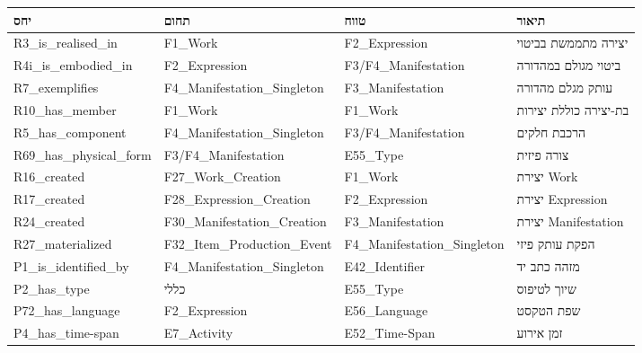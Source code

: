 \documentclass[12pt,a4paper]{article}
\newcommand{\en}[1]{\textenglish{\LR{#1}}}
\begin{document}
{\small
\begin{longtable}{|p{4cm}|p{3.5cm}|p{3.5cm}|p{4.5cm}|}
\hline
\textbf{יחס} & \textbf{תחום} & \textbf{טווח} & \textbf{תיאור} \\
\hline
\endhead

\textenglish{R3\_is\_realised\_in} & \textenglish{F1\_Work} & \textenglish{F2\_Expression} & יצירה מתממשת בביטוי \\
\hline
\textenglish{R4i\_is\_embodied\_in} & \textenglish{F2\_Expression} & \textenglish{F3/F4\_Manifestation} & ביטוי מגולם במהדורה \\
\hline
\textenglish{R7\_exemplifies} & \textenglish{F4\_Manifestation\_Singleton} & \textenglish{F3\_Manifestation} & עותק מגלם מהדורה \\
\hline
\textenglish{R10\_has\_member} & \textenglish{F1\_Work} & \textenglish{F1\_Work} & בת-יצירה כוללת יצירות \\
\hline
\textenglish{R5\_has\_component} & \textenglish{F4\_Manifestation\_Singleton} & \textenglish{F3/F4\_Manifestation} & הרכבת חלקים \en{(BU→CU→PU)} \\
\hline
\textenglish{R69\_has\_physical\_form} & \textenglish{F3/F4\_Manifestation} & \textenglish{E55\_Type} & צורה פיזית \\
\hline
\textenglish{R16\_created} & \textenglish{F27\_Work\_Creation} & \textenglish{F1\_Work} & יצירת \textenglish{Work} \\
\hline
\textenglish{R17\_created} & \textenglish{F28\_Expression\_Creation} & \textenglish{F2\_Expression} & יצירת \textenglish{Expression} \\
\hline
\textenglish{R24\_created} & \textenglish{F30\_Manifestation\_Creation} & \textenglish{F3\_Manifestation} & יצירת \textenglish{Manifestation} \\
\hline
\textenglish{R27\_materialized} & \textenglish{F32\_Item\_Production\_Event} & \textenglish{F4\_Manifestation\_Singleton} & הפקת עותק פיזי \\
\hline
\textenglish{P1\_is\_identified\_by} & \textenglish{F4\_Manifestation\_Singleton} & \textenglish{E42\_Identifier} & מזהה כתב יד \\
\hline
\textenglish{P2\_has\_type} & כללי & \textenglish{E55\_Type} & שיוך לטיפוס \\
\hline
\textenglish{P72\_has\_language} & \textenglish{F2\_Expression} & \textenglish{E56\_Language} & שפת הטקסט \\
\hline
\textenglish{P4\_has\_time-span} & \textenglish{E7\_Activity} & \textenglish{E52\_Time-Span} & זמן אירוע \\

\end{longtable}}
\end{document}
